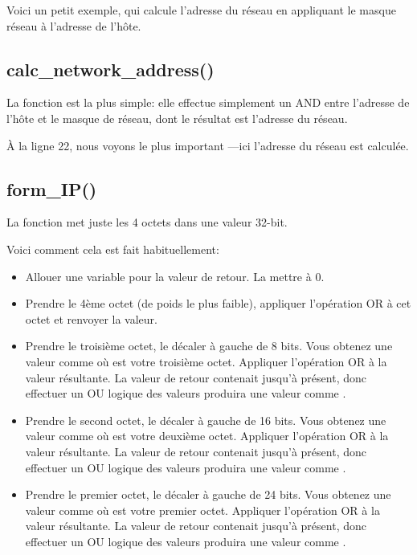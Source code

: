 Voici un petit exemple, qui calcule l'adresse du réseau en appliquant le masque réseau
à l'adresse de l'hôte.



\subsection{calc\_network\_address()}

La fonction  est la plus simple:
elle effectue simplement un AND entre l'adresse de l'hôte et le masque de réseau,
dont le résultat est l'adresse du réseau.



À la ligne 22, nous voyons le plus important \AND---ici l'adresse du réseau est calculée.

\subsection{form\_IP()}

La fonction  met juste les 4 octets dans une valeur 32-bit.

Voici comment cela est fait habituellement:

\begin{itemize}
\item Allouer une variable pour la valeur de retour.  La mettre à 0.

\item Prendre le 4ème octet (de poids le plus faible), appliquer l'opération OR à
cet octet et renvoyer la valeur.

\item Prendre le troisième octet, le décaler à gauche de 8 bits.
Vous obtenez une valeur comme  où  est votre troisième octet.
Appliquer l'opération OR à la valeur résultante.
La valeur de retour contenait  jusqu'à présent, donc effectuer un
OU logique des valeurs produira une valeur comme .

\item Prendre le second octet, le décaler à gauche de 16 bits.
Vous obtenez une valeur comme  où  est votre deuxième octet.
Appliquer l'opération OR à la valeur résultante.
La valeur de retour contenait  jusqu'à présent, donc effectuer un
OU logique des valeurs produira une valeur comme .

\item Prendre le premier octet, le décaler à gauche de 24 bits.
Vous obtenez une valeur comme  où  est votre premier octet.
Appliquer l'opération OR à la valeur résultante.
La valeur de retour contenait  jusqu'à présent, donc effectuer un
OU logique des valeurs produira une valeur comme .

\end{itemize}

